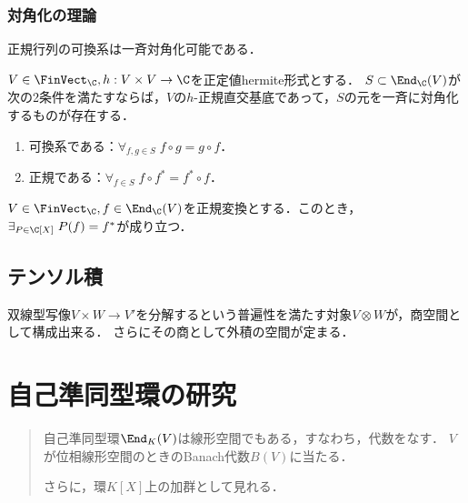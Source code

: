 \documentclass[uplatex,dvipdfmx]{jsreport}
\begin{document}
\subsection{対角化の理論}

\begin{tcolorbox}[colframe=ForestGreen, colback=ForestGreen!10!white,breakable,colbacktitle=ForestGreen!40!white,coltitle=black,fonttitle=\bfseries\sffamily,
title=]
    正規行列の可換系は一斉対角化可能である．
\end{tcolorbox}

\begin{proposition}[正規行列の可換系は一斉対角化可能]
    $V\in\FinVect_\C,h:V\times V\to\C$を正定値hermite形式とする．
    $S\subset\End_\C(V)$が次の2条件を満たすならば，$V$の$h$-正規直交基底であって，$S$の元を一斉に対角化するものが存在する．
    \begin{enumerate}
        \item 可換系である：$\forall_{f,g\in S}\;f\circ g=g\circ f$．
        \item 正規である：$\forall_{f\in S}\;f\circ f^*=f^*\circ f$．
    \end{enumerate}
\end{proposition}

\begin{lemma}[随伴は多項式変換である]
    $V\in\FinVect_\C,f\in\End_\C(V)$を正規変換とする．このとき，$\exists_{P\in\C[X]}\;P(f)=f^*$が成り立つ．
\end{lemma}


\section{テンソル積}

\begin{tcolorbox}[colframe=ForestGreen, colback=ForestGreen!10!white,breakable,colbacktitle=ForestGreen!40!white,coltitle=black,fonttitle=\bfseries\sffamily,
title=]
    双線型写像$V\times W\to V'$を分解するという普遍性を満たす対象$V\otimes W$が，商空間として構成出来る．
    さらにその商として外積の空間が定まる．
\end{tcolorbox}

\chapter{自己準同型環の研究}

\begin{quotation}
    自己準同型環$\End_K(V)$は線形空間でもある，すなわち，代数をなす．
    $V$が位相線形空間のときのBanach代数$B(V)$に当たる．

    さらに，環$K[X]$上の加群として見れる．
\end{quotation}
\end{document}
